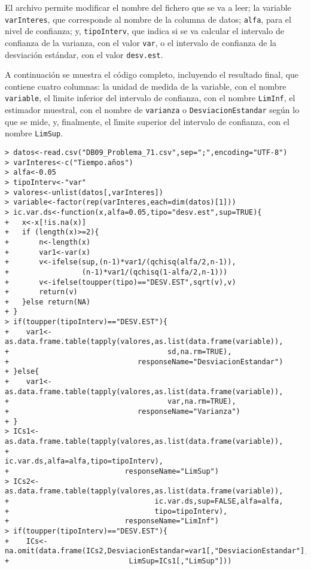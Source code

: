 \begin{solucion}
 El archivo permite modificar el nombre del fichero que se va a leer; la variable \texttt{varInteres}, que corresponde al nombre de la columna de datos; \texttt{alfa}, para el nivel de confianza; y, \texttt{tipoInterv}, que indica si se va calcular el intervalo de confianza de la varianza, con el valor \texttt{var}, o el intervalo de confianza de la desviaci\'on est\'andar, con el valor \texttt{desv.est}.
 \par 
 A continuaci\'on se muestra el c\'odigo completo, incluyendo el resultado final, que contiene cuatro columnas: la unidad de medida de la variable, con el nombre \texttt{variable}, el l\'{\i}mite inferior del intervalo de confianza, con el nombre \texttt{LimInf}, el estimador muestral, con el nombre de \texttt{varianza} o \texttt{DesviacionEstandar} seg\'un lo que se mide, y, finalmente, el l\'{\i}mite superior del intervalo de confianza, con el nombre \texttt{LimSup}.
 \begin{verbatim}
> datos<-read.csv("DB09_Problema_71.csv",sep=";",encoding="UTF-8")
> varInteres<-c("Tiempo.años")
> alfa<-0.05
> tipoInterv<-"var"
> valores<-unlist(datos[,varInteres])
> variable<-factor(rep(varInteres,each=dim(datos)[1]))
> ic.var.ds<-function(x,alfa=0.05,tipo="desv.est",sup=TRUE){
+   x<-x[!is.na(x)]
+   if (length(x)>=2){
+       n<-length(x)
+       var1<-var(x)
+       v<-ifelse(sup,(n-1)*var1/(qchisq(alfa/2,n-1)),
+                 (n-1)*var1/(qchisq(1-alfa/2,n-1)))
+       v<-ifelse(toupper(tipo)=="DESV.EST",sqrt(v),v)
+       return(v)
+   }else return(NA)
+ }
> if(toupper(tipoInterv)=="DESV.EST"){
+    var1<-as.data.frame.table(tapply(valores,as.list(data.frame(variable)),
+                                     sd,na.rm=TRUE),
+                              responseName="DesviacionEstandar")
+ }else{
+    var1<-as.data.frame.table(tapply(valores,as.list(data.frame(variable)),
+                                     var,na.rm=TRUE),
+                              responseName="Varianza") 
+ }
> ICs1<-as.data.frame.table(tapply(valores,as.list(data.frame(variable)),
+                                  ic.var.ds,alfa=alfa,tipo=tipoInterv),
+                           responseName="LimSup")
> ICs2<-as.data.frame.table(tapply(valores,as.list(data.frame(variable)),
+                                  ic.var.ds,sup=FALSE,alfa=alfa,
+                                  tipo=tipoInterv),
+                           responseName="LimInf")
> if(toupper(tipoInterv)=="DESV.EST"){
+    ICs<-na.omit(data.frame(ICs2,DesviacionEstandar=var1[,"DesviacionEstandar"],
+                            LimSup=ICs1[,"LimSup"]))

\end{verbatim}
\end{solucion}
